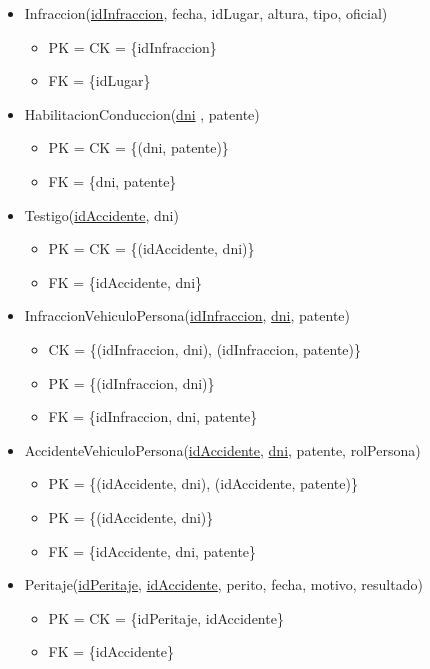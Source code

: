 \begin{itemize}
\item Infraccion(\underline{idInfraccion}, fecha, idLugar, altura, tipo, oficial)
  \begin{itemize}
  \item[] PK = CK = \{idInfraccion\}
  \item[] FK = \{idLugar\}
  \end{itemize}

\item HabilitacionConduccion(\underline{dni} , patente)
  \begin{itemize}
  \item[] PK = CK = \{(dni, patente)\}
  \item[] FK = \{dni, patente\}
  \end{itemize}

\item Testigo(\underline{idAccidente}, dni)
  \begin{itemize}
  \item[] PK = CK = \{(idAccidente, dni)\}
  \item[] FK = \{idAccidente, dni\}
  \end{itemize}

\item InfraccionVehiculoPersona(\underline{idInfraccion}, \underline{dni}, patente)
  \begin{itemize}
  \item[] CK = \{(idInfraccion, dni), (idInfraccion, patente)\}
  \item[] PK = \{(idInfraccion, dni)\}
  \item[] FK = \{idInfraccion, dni, patente\}
  \end{itemize}

\item AccidenteVehiculoPersona(\underline{idAccidente}, \underline{dni}, patente, rolPersona)
  \begin{itemize}
  \item[] PK = \{(idAccidente, dni), (idAccidente, patente)\}
  \item[] PK = \{(idAccidente, dni)\}
  \item[] FK = \{idAccidente, dni, patente\}
  \end{itemize}


\item Peritaje(\underline{idPeritaje}, \underline{idAccidente}, perito, fecha, motivo, resultado)
  \begin{itemize}
  \item[] PK = CK = \{idPeritaje, idAccidente\}
  \item[] FK = \{idAccidente\}
  \end{itemize}

\end{itemize}